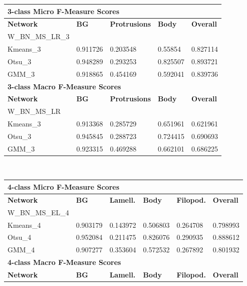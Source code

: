 \begin {table}
	\begin{flushleft}
		\begin {tabular}[!htb]{|l|l|l|l|l|}
			\hline\multicolumn{5}{|l|}{\textbf{3-class Micro F-Measure Scores}} \\ \hline
			\textbf{Network}& \textbf{BG}& \textbf{Protrusions}& \textbf{Body}& \textbf{Overall} \\ \hline
			W\_BN\_MS\_LR\_3& & & &  \\ \hline
			Kmeans\_3& 0.911726& 0.203548& 0.55854& 0.827114 \\ \hline
			Otsu\_3& 0.948289& 0.293253& 0.825507& 0.893721 \\ \hline
			GMM\_3& 0.918865& 0.454169& 0.592041& 0.839736 \\ \hline
			\multicolumn{5}{|l|}{\textbf{3-class Macro F-Measure Scores}} \\ \hline
			\textbf{Network}& \textbf{BG}& \textbf{Protrusions}& \textbf{Body}& \textbf{Overall} \\ \hline
			W\_BN\_MS\_LR& & & &  \\ \hline
			Kmeans\_3& 0.913368& 0.285729& 0.651961& 0.621961 \\ \hline
			Otsu\_3& 0.945845& 0.288723& 0.724415& 0.690693 \\ \hline
			GMM\_3& 0.923315& 0.469288& 0.662101& 0.686225 \\ \hline
		\end {tabular}
		\vspace{0.5cm}\\
		\begin {tabular}[!htb]{|l|l|l|l|l|l|}
			\hline\multicolumn{6}{|l|}{\textbf{4-class Micro F-Measure Scores}} \\ \hline
			\textbf{Network}& \textbf{BG}& \textbf{Lamell.}& \textbf{Body}& \textbf{Filopod.}& \textbf{Overall} \\ \hline
			W\_BN\_MS\_EL\_4& & & & &  \\ \hline
			Kmeans\_4& 0.903179& 0.143972& 0.506803& 0.264708& 0.798993 \\ \hline
			Otsu\_4& 0.952084& 0.211475& 0.826076& 0.290935& 0.888612 \\ \hline
			GMM\_4& 0.907277& 0.353604& 0.572532& 0.267892& 0.801932 \\ \hline
			\multicolumn{6}{|l|}{\textbf{4-class Macro F-Measure Scores}} \\ \hline
			\textbf{Network}& \textbf{BG}& \textbf{Lamell.}& \textbf{Body}& \textbf{Filopod.}& \textbf{Overall} \\ \hline

\end{tabular}
\end{flushleft}
\end{table}
